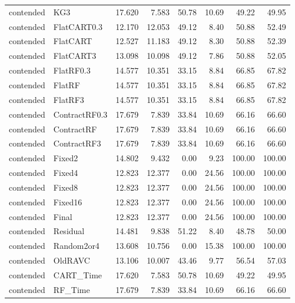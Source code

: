 \begin{longtable}{@{}llrrrrrr@{}}
contended & KG3 & 17.620 & 7.583 & 50.78 & 10.69 & 49.22 & 49.95\\
contended & FlatCART0.3 & 12.170 & 12.053 & 49.12 & 8.40 & 50.88 & 52.49\\
contended & FlatCART & 12.527 & 11.183 & 49.12 & 8.30 & 50.88 & 52.39\\
contended & FlatCART3 & 13.098 & 10.098 & 49.12 & 7.86 & 50.88 & 52.05\\
contended & FlatRF0.3 & 14.577 & 10.351 & 33.15 & 8.84 & 66.85 & 67.82\\
contended & FlatRF & 14.577 & 10.351 & 33.15 & 8.84 & 66.85 & 67.82\\
contended & FlatRF3 & 14.577 & 10.351 & 33.15 & 8.84 & 66.85 & 67.82\\
contended & ContractRF0.3 & 17.679 & 7.839 & 33.84 & 10.69 & 66.16 & 66.60\\
contended & ContractRF & 17.679 & 7.839 & 33.84 & 10.69 & 66.16 & 66.60\\
contended & ContractRF3 & 17.679 & 7.839 & 33.84 & 10.69 & 66.16 & 66.60\\
contended & Fixed2 & 14.802 & 9.432 & 0.00 & 9.23 & 100.00 & 100.00\\
contended & Fixed4 & 12.823 & 12.377 & 0.00 & 24.56 & 100.00 & 100.00\\
contended & Fixed8 & 12.823 & 12.377 & 0.00 & 24.56 & 100.00 & 100.00\\
contended & Fixed16 & 12.823 & 12.377 & 0.00 & 24.56 & 100.00 & 100.00\\
contended & Final & 12.823 & 12.377 & 0.00 & 24.56 & 100.00 & 100.00\\
contended & Residual & 14.481 & 9.838 & 51.22 & 8.40 & 48.78 & 50.00\\
contended & Random2or4 & 13.608 & 10.756 & 0.00 & 15.38 & 100.00 & 100.00\\
contended & OldRAVC & 13.106 & 10.007 & 43.46 & 9.77 & 56.54 & 57.03\\
contended & CART\_Time & 17.620 & 7.583 & 50.78 & 10.69 & 49.22 & 49.95\\
contended & RF\_Time & 17.679 & 7.839 & 33.84 & 10.69 & 66.16 & 66.60\\
\bottomrule\end{longtable}\normalsize
